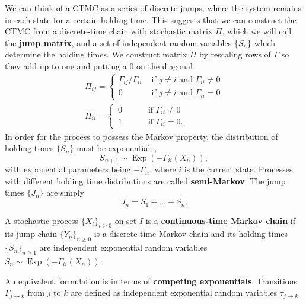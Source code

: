 We can think of a CTMC as a series of discrete jumps, where the system remains in each state for a certain holding time. This suggests that we can construct the CTMC from a discrete-time chain with stochastic matrix $\Pi$, which we will call the \textbf{jump matrix}, and a set of independent random variables $\{S_n\}$ which determine the holding times. We construct matrix $\Pi$ by rescaling rows of $\Gamma$ so they add up to one and putting a $0$ on the diagonal
\begin{equation}
	\begin{array}{l}
		\Pi_{i j}=\left\{
		\begin{array}{ll}
			\Gamma_{i j} / \Gamma_{ii} & \text { if } j \neq i \text { and } \Gamma_{ii} \neq 0 \\
			 0 & \text { if } j \neq i \text { and } \Gamma_{ii}=0
		\end{array}\right. 
		\\ 
		\Pi_{i i}=\left\{
		\begin{array}{ll}
			0 & \qquad  \text { if } \Gamma_{ii} \neq 0 \\
			1 & \qquad \text { if } \Gamma_{ii}=0.
		\end{array}\right.
	\end{array}
\end{equation}
In order for the process to possess the Markov property, the distribution of holding times $\{S_n\}$ must be exponential~\cite{norris1998markov}, 
\begin{equation}
	S_{n+1} \sim \operatorname{Exp}(-{\Gamma_{ii}}(X_n)),
\end{equation}
with exponential parameters being $-\Gamma_{ii}$, where $i$ is the current state.
Processes with different holding time distributions are called \textbf{semi-Markov}. The jump times $\{J_n\}$ are simply 
\begin{equation}
	J_{n}=S_{1}+\ldots+S_{n}.
\end{equation}
\begin{definition}
	A stochastic process $\{X_t\}_{t \geq 0}$ on set $I$ is a \textbf{continuous-time Markov chain} if its jump chain $\{Y_n\}_{n \geq 0}$ is a discrete-time Markov chain and its holding times $\{S_n\}_{n \geq 1}$ are independent exponential random variables $S_n \sim \operatorname{Exp}(-{\Gamma_{ii}}(X_n))$.
\end{definition}
An equivalent formulation is in terms of \textbf{competing exponentials}. Transitions $\Gamma_{j \rightarrow k}$ from $j$ to $k$ are defined as independent exponential random variables $\tau_{j \rightarrow k}$
